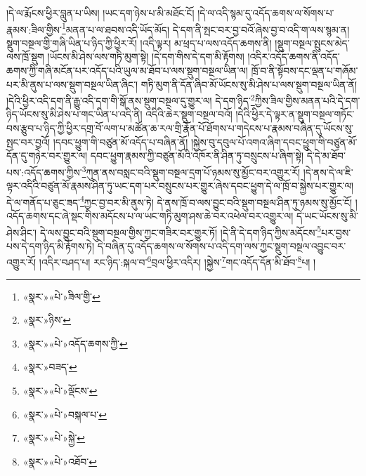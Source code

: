 །དེ་ལ་རྨོངས་ཕྱིར་བླུན་པ་ཡིས། །ཡང་དག་ཉེས་པ་མི་མཐོང་ངོ། །དེ་ལ་འདི་སྙམ་དུ་འདོད་ཆགས་ལ་སོགས་པ་རྣམས་:ཟིལ་གྱིས་\footnote{«སྣར་»«པེ་»ཟིལ་གྱི་}མནན་པ་ལ་ཐབས་འདི་ཡོད་མོད། དེ་དག་ནི་སྤང་བར་བྱ་བའོ་ཞེས་བྱ་བ་འདི་ག་ལས་སྙམ་ན། སྡུག་བསྔལ་གྱི་གཞི་ཡིན་པ་ཉིད་ཀྱི་ཕྱིར་རོ། །འདི་ལྟར། མ་ཕྲད་པ་ལས་འདོད་ཆགས་ནི། །སྡུག་བསྔལ་སྤུངས་མེད་ལས་ཁྲོ་སྡུག །ཡོངས་མི་ཤེས་ལས་གཏི་མུག་སྟེ། །དེ་དག་གིས་དེ་དག་མི་རྟོགས། །འདིར་འདོད་ཆགས་ནི་འདོད་ཆགས་ཀྱི་གཞི་མངོན་པར་འདོད་པའི་ཡུལ་མ་ཐོབ་པ་ལས་སྡུག་བསྔལ་ཡིན་ལ། ཁྲོ་བ་ནི་སྟོབས་དང་ལྡན་པ་གཞོམ་པར་མི་ནུས་པ་ལས་སྡུག་བསྔལ་ཡིན་ཞིང་། གཏི་མུག་ནི་དོན་ཞིབ་མོ་ཡོངས་སུ་མི་ཤེས་པ་ལས་སྡུག་བསྔལ་ཡིན་ནོ། །དེའི་ཕྱིར་འདི་དག་ནི་རྒྱུ་འདི་དག་གི་སྒོ་ནས་སྡུག་བསྔལ་དུ་གྱུར་ལ། དེ་དག་ཉིད་\footnote{«སྣར་»ཉིས་}ཀྱིས་ཟིལ་གྱིས་མནན་པའི་དེ་དག་ཉིད་ཡོངས་སུ་མི་ཤེས་པ་གང་ཡིན་པ་འདི་ནི། འདིའི་ཆེར་སྡུག་བསྔལ་བའོ། །དེའི་ཕྱིར་དེ་ལྟར་ན་སྡུག་བསྔལ་གཏོང་བས་རྩུབ་པ་ཉིད་ཀྱི་ཕྱིར་དགྲ་བོ་ལག་པ་མཚོན་ཆ་རལ་གྲི་རྣོན་པོ་ཐོགས་པ་གདེངས་པ་རྣམས་བཞིན་དུ་ཡོངས་སུ་སྤང་བར་བྱའོ། །དབང་ཕྱུག་གི་བཙུན་མོ་འདོད་པ་བཞིན་ནོ། །སྐྱེས་བུ་དབུལ་པོ་འགའ་ཞིག་དབང་ཕྱུག་གི་བཙུན་མོ་དོན་དུ་གཉེར་བར་གྱུར་ལ། དབང་ཕྱུག་རྣམས་ཀྱི་བཙུན་མོའི་འཁོར་ནི་ཤིན་ཏུ་བསྲུངས་པ་ཞིག་སྟེ། དེ་དེ་མ་ཐོབ་པས་:འདོད་ཆགས་ཀྱིས་\footnote{«སྣར་»«པེ་»འདོད་ཆགས་ཀྱི་}ཀུན་ནས་བསླང་བའི་སྡུག་བསྔལ་དྲག་པོ་ཉམས་སུ་མྱོང་བར་འགྱུར་རོ། །དེ་ནས་དེ་ལ་ཇི་ལྟར་འདིའི་བཙུན་མོ་རྣམས་ཤིན་ཏུ་ཡང་དག་པར་བསྲུངས་པར་གྱུར་ཞེས་དབང་ཕྱུག་དེ་ལ་ཁྲོ་བ་སྐྱེས་པར་གྱུར་ལ། དེ་ལ་གནོད་པ་ཅུང་ཟད་\footnote{«སྣར་»བཟད་}ཀྱང་བྱ་བར་མི་ནུས་ཏེ། དེ་ནས་ཁྲོ་བ་ལས་བྱུང་བའི་སྡུག་བསྔལ་ཤིན་ཏུ་ཉམས་སུ་མྱོང་ངོ། །འདོད་ཆགས་དང་ཞེ་སྡང་གིས་མདོངས་པ་ལ་ཡང་གཏི་མུག་ཤས་ཆེ་བར་འཕེལ་བར་འགྱུར་ལ། དེ་ཡང་ཡོངས་སུ་མི་ཤེས་ཤིང་། དེ་ལས་བྱུང་བའི་སྡུག་བསྔལ་གྱིས་ཀྱང་གཟིར་བར་གྱུར་ཏོ། །དེ་ནི་དེ་དག་ཉིད་ཀྱིས་མདོངས་\footnote{«སྣར་»«པེ་»ལྡོངས་}པར་བྱས་པས་དེ་དག་ཉིད་མི་རྟོགས་ཏེ། དེ་བཞིན་དུ་འདོད་ཆགས་ལ་སོགས་པ་འདི་དག་ལས་ཀྱང་སྡུག་བསྔལ་འབྱུང་བར་འགྱུར་རོ། །འདིར་བཤད་པ། རང་ཉིད་:སྐལ་བ་\footnote{«སྣར་»«པེ་»བསྐལ་པ་}བྲལ་ཕྱིར་འདིར། །སྐྱེས་\footnote{«སྣར་»«པེ་»སྐྱེ་}གང་འདོད་དོན་མི་ཐོབ་\footnote{«སྣར་»«པེ་»འཐོབ་}པ། །
